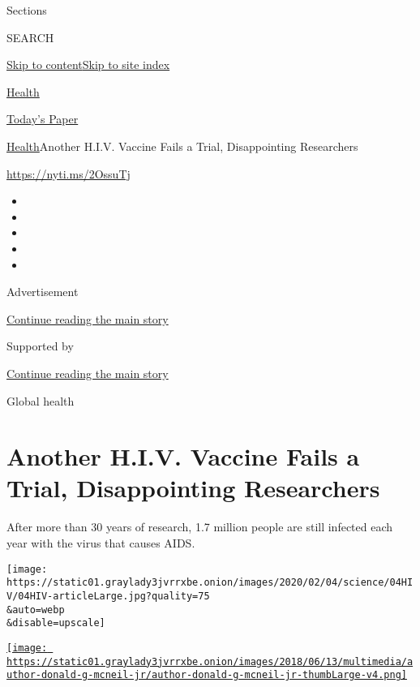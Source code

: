 Sections

SEARCH

\protect\hyperlink{site-content}{Skip to
content}\protect\hyperlink{site-index}{Skip to site index}

\href{https://www.nytimes3xbfgragh.onion/section/health}{Health}

\href{https://myaccount.nytimes3xbfgragh.onion/auth/login?response_type=cookie\&client_id=vi}{}

\href{https://www.nytimes3xbfgragh.onion/section/todayspaper}{Today's
Paper}

\href{/section/health}{Health}\textbar{}Another H.I.V. Vaccine Fails a
Trial, Disappointing Researchers

\url{https://nyti.ms/2OssuTj}

\begin{itemize}
\item
\item
\item
\item
\item
\end{itemize}

Advertisement

\protect\hyperlink{after-top}{Continue reading the main story}

Supported by

\protect\hyperlink{after-sponsor}{Continue reading the main story}

Global health

\hypertarget{another-hiv-vaccine-fails-a-trial-disappointing-researchers}{%
\section{Another H.I.V. Vaccine Fails a Trial, Disappointing
Researchers}\label{another-hiv-vaccine-fails-a-trial-disappointing-researchers}}

After more than 30 years of research, 1.7 million people are still
infected each year with the virus that causes AIDS.

\texttt{[image: https://static01.graylady3jvrrxbe.onion/images/2020/02/04/science/04HIV/04HIV-articleLarge.jpg?quality=75\\\&auto=webp\\\&disable=upscale]}

\href{https://www.nytimes3xbfgragh.onion/by/donald-g-mcneil-jr}{\texttt{[image: https://static01.graylady3jvrrxbe.onion/images/2018/06/13/multimedia/author-donald-g-mcneil-jr/author-donald-g-mcneil-jr-thumbLarge-v4.png]}}

